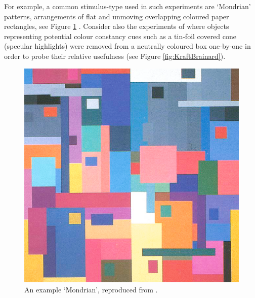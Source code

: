For example, a common stimulus-type used in such experiments are `Mondrian' patterns, arrangements of flat and unmoving overlapping coloured paper rectangles, see Figure \ref{fig:mondrian} \citep{hurlbert_colour_1999}. Consider also the experiments of \citet{kraft_mechanisms_1999} where objects representing potential colour constancy cues such as a tin-foil covered cone (specular highlights) were removed from a neutrally coloured box one-by-one in order to probe their relative usefulness (see Figure \ref{fig:KraftBrainard}).

\begin{figure}[htbp]
\includegraphics[max width=\textwidth]{figs/tablet/mondrian.png}
\caption{An example `Mondrian', reproduced from \citet{land_recent_1986}.}
\label{fig:mondrian}
\end{figure}

